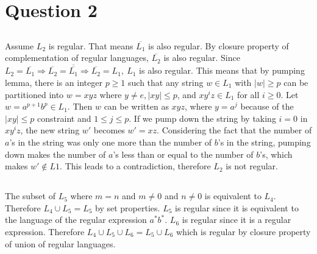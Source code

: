 \documentclass[12pt]{article}
\begin{document}
\newpage

\section{Question 2}

\subsection{}

\begin{center}
Assume $L_2$ is regular.
That means $\overline{L_1}$ is also regular.
By closure property of complementation of regular languages, $\overline{L_2}$ is also regular.
Since $L_2 = \overline{L_1} \Rightarrow \overline{L_2}=\overline{\overline{L_1}} \Rightarrow \overline{L_2}=L_1,\ L_1$ is also regular.
This means that by pumping lemma, there is an integer $p \ge 1$ such that any string $w \in L_1$ with $\vert w\vert \ge p$ can be partitioned into $w=xyz$ where $y\neq e, \vert xy\vert \le p$, and $xy^iz \in L_1$ for all $i \ge 0$.
Let $w = a^{p+1}b^p \in L_1$.
Then $w$ can be written as $xyz$, where $y = a^j$ because of the $\vert xy\vert \leq p$ constraint and $1 \le j \le p$.
If we pump down the string by taking $i=0$ in $xy^iz$, the new string $w'$ becomes $w' = xz$.
Considering the fact that the number of $a$'s in the string was only one more than the number of $b$'s in the string, pumping down makes the number of $a$'s less than or equal to the number of $b$'s, which makes $w' \notin L1$.
This leads to a contradiction, therefore $L_2$ is not regular.
\end{center}

\subsection{}

\begin{center}
The subset of $L_5$ where $m=n$ and $m \neq 0$ and $n \neq 0$ is equivalent to $L_4$.
Therefore $L_4 \cup L_5 = L_5$ by set properties.
$L_5$ is regular since it is equivalent to the language of the regular expression $a^*b^*$.
$L_6$ is regular since it is a regular expression.
Therefore $L_4 \cup L_5 \cup L_6 = L_5 \cup L_6$ which is regular by closure property of union of regular languages.
\end{center}
\end{document}
